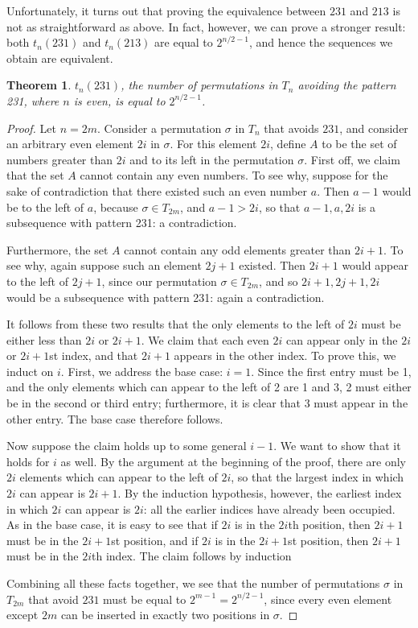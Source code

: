\documentclass[11pt,letterpaper,twoside,english]{article}
\theoremstyle{theorem}
\newtheorem{theorem}{Theorem}[section]
\theoremstyle{remark}
\begin{document}
Unfortunately, it turns out that proving the equivalence between $231$ and $213$ is not as straightforward as above. In fact, however, we can prove a stronger result: both $t_n(231)$ and $t_n(213)$ are equal to $2^{n/2-1}$, and hence the sequences we obtain are equivalent.

\begin{theorem}
$t_n(231)$, the number of permutations in $T_n$ avoiding the pattern 231, where $n$ is even, is equal to $2^{n/2-1}$.
\end{theorem}

\begin{proof}
Let $n=2m$. Consider a permutation $\sigma$ in $T_{n}$ that avoids $231$, and consider an arbitrary even element $2i$ in $\sigma$. For this element $2i$, define $A$ to be the set of numbers greater than $2i$ and to its left in the permutation $\sigma$. First off, we claim that the set $A$ cannot contain any even numbers. To see why, suppose for the sake of contradiction that there existed such an even number $a$. Then $a-1$ would be to the left of $a$, because $\sigma\in T_{2m}$, and $a-1>2i$, so that $a-1, a, 2i$ is a subsequence with pattern 231: a contradiction.

Furthermore, the set $A$ cannot contain any odd elements greater than $2i+1$. To see why, again suppose such an element $2j+1$ existed. Then $2i+1$ would appear to the left of $2j+1$, since our permutation $\sigma\in T_{2m}$, and so $2i+1, 2j+1, 2i$ would be a subsequence with pattern 231: again a contradiction.

It follows from these two results that the only elements to the left of $2i$ must be either less than $2i$ or $2i+1$. We claim that each even $2i$ can appear only in the $2i$ or $2i+1$st index, and that $2i+1$ appears in the other index. To prove this, we induct on $i$. First, we address the base case: $i=1$. Since the first entry must be 1, and the only elements which can appear to the left of 2 are 1 and 3, 2 must either be in the second or third entry; furthermore, it is clear that 3 must appear in the other entry. The base case therefore follows.

Now suppose the claim holds up to some general $i-1$. We want to show that it holds for $i$ as well. By the argument at the beginning of the proof, there are only $2i$ elements which can appear to the left of $2i$, so that the largest index in which $2i$ can appear is $2i+1$. By the induction hypothesis, however, the earliest index in which $2i$ can appear is $2i$: all the earlier indices have already been occupied. As in the base case, it is easy to see that if $2i$ is in the $2i$th position, then $2i+1$ must be in the $2i+1$st position, and if $2i$ is in the $2i+1$st position, then $2i+1$ must be in the $2i$th index. The claim follows by induction

Combining all these facts together, we see that the number of permutations $\sigma$ in $T_{2m}$ that avoid $231$ must be equal to $ 2^{m-1} = 2^{n/2-1}$, since every even element except $2m$ can be inserted in exactly two positions in $\sigma$.

\end{proof}
\end{document}
